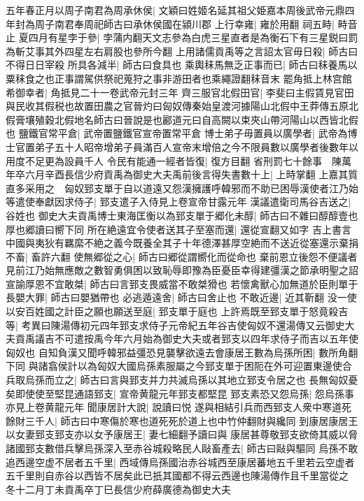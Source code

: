 五年春正月以周子南君為周承休侯|{
	文穎曰姓姬名延其祖父姫嘉本周後武帝元鼎四年封為周子南君奉周祀師古曰承休侯國在潁川郡}
上行幸雍|{
	雍於用翻}
祠五畤|{
	畤音止}
夏四月有星孛于參|{
	孛蒲内翻天文志參為白虎三星直者是為衡石下有三星鋭曰罰為斬艾事其外四星左右肩股也參所今翻}
上用諸儒貢禹等之言詔太官毋日殺|{
	師古曰不得日日宰殺}
所具各減半|{
	師古曰食具也}
乘輿秣馬無乏正事而已|{
	師古曰秣養馬以粟秣食之也正事謂駕供祭祀蒐狩之事非游田者也乘繩證翻秣音末}
罷角抵上林宫館希御幸者|{
	角抵見二十一卷武帝元封三年}
齊三服官北假田官|{
	李斐曰主假賃見官田與民收其假税也故置田農之官晉灼曰匈奴傳秦始皇渡河據陽山北假中王莽傳五原北假膏壤殖穀北假地名師古曰晉說是也酈道元曰自高闕以束夾山帶河陽山以西皆北假也}
鹽鐵官常平倉|{
	武帝置鹽鐵官宣帝置常平倉}
博士弟子毋置員以廣學者|{
	武帝為博士官置弟子五十人昭帝增弟子員滿百人宣帝末增倍之今不限員數以廣學者後數年以用度不足更為設員千人}
令民有能通一經者皆復|{
	復方目翻}
省刑罰七十餘事　陳萬年卒六月辛酉長信少府貢禹為御史大夫禹前後言得失書數十上|{
	上時掌翻}
上嘉其質直多采用之　匈奴郅支單于自以道遠又怨漢擁護呼韓邪而不助已困辱漢使者江乃始等遣使奉獻因求侍子|{
	郅支遣子入侍見上卷宣帝甘露元年}
漢議遣衛司馬谷吉送之|{
	谷姓也}
御史大夫貢禹博士東海匡衡以為郅支單于郷化未醇|{
	師古曰不雜曰醇醇壹也厚也郷讀曰嚮下同}
所在絶遠宜令使者送其子至塞而還|{
	還從宣翻又如字}
吉上書言中國與夷狄有羈縻不絶之義今既養全其子十年德澤甚厚空絶而不送近從塞還示棄捐不畜|{
	畜許六翻}
使無郷從之心|{
	師古曰郷從謂嚮化而從命也}
棄前恩立後怨不便議者見前江乃始無應敵之數智勇俱困以致恥辱即豫為臣憂臣幸得建彊漢之節承明聖之詔宣諭厚恩不宜敢桀|{
	師古曰言郅支畏威當不敢桀猾也}
若懷禽獸心加無道於臣則單于長嬰大罪|{
	師古曰嬰猶帶也}
必逃遁遠舍|{
	師古曰舍止也}
不敢近邊|{
	近其靳翻}
没一使以安百姓國之計臣之願也願送至庭|{
	郅支單于庭也}
上許焉既至郅支單于怒竟殺吉等|{
	考異曰陳湯傳初元四年郅支求侍子元帝紀五年谷吉使匈奴不還湯傳又云御史大夫貢禹議吉不可遣按禹今年六月始為御史大夫或者郅支以四年求侍子而吉以五年使匈奴也}
自知負漢又聞呼韓邪益彊恐見襲擊欲遠去會康居王數為烏孫所困|{
	數所角翻下同}
與諸翕侯計以為匈奴大國烏孫素服屬之今郅支單于困阨在外可迎置東邊使合兵取烏孫而立之|{
	師古曰言與郅支并力共滅烏孫以其地立郅支令居之也}
長無匈奴憂矣即使使至堅昆通語郅支|{
	宣帝黄龍元年郅支都堅昆}
郅支素恐又怨烏孫|{
	怨烏孫事亦見上卷黄龍元年}
聞康居計大說|{
	說讀曰悦}
遂與相結引兵而西郅支人衆中寒道死餘財三千人|{
	師古曰中寒傷於寒也道死死於道上也中竹仲翻財與纔同}
到康居康居王以女妻郅支郅支亦以女予康居王|{
	妻七細翻予讀曰與}
康居甚尊敬郅支欲倚其威以脅諸國郅支數借兵擊烏孫深入至赤谷城殺略民人敺畜產去|{
	師古曰敺與驅同}
烏孫不敢追西邊空虚不居者五千里|{
	西域傳烏孫國治赤谷城西至康居蕃地五千里若云空虚者五千里則自赤谷以西皆不居矣此已扺其國都不得云西邊也陳湯傳作且千里當從之}
冬十二月丁未貢禹卒丁巳長信少府薛廣德為御史大夫

